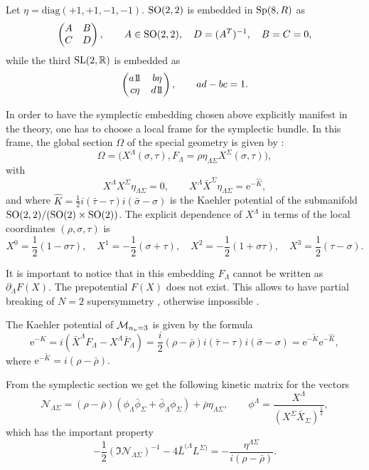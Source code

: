 \documentclass[a4paper,12pt]{article}
\begin{document}
Let $\eta=\mathrm{diag}(+1,+1,-1,-1)$. $\mathrm{SO}(2,2)$ is embedded in
$\mathrm{Sp}(8, R)$ as
$$\begin{pmatrix}
A&B\\C& D\end{pmatrix},\qquad A\in \mathrm{SO}(2,2), \quad D=(A^T)^{-1},
\quad B=C=0,$$ while the  third  $\mathrm{SL}(2,\mathbb{R})$ is embedded as
$$\begin{pmatrix}
a\relax{\rm 1\kern-.28em 1}&b\eta\\c\eta& d\relax{\rm 1\kern-.28em 1}\end{pmatrix},\qquad ad-bc=1.$$

In order to have the symplectic embedding chosen above explicitly
manifest in the theory, one has to choose a local frame for the
symplectic bundle. In this frame, the global section $\Omega$ of
the special geometry is given by \cite{cdfp}:
$$\Omega=\bigl(X^\Lambda(\sigma,\tau),
F_\Lambda=\rho\eta_{\Lambda\Sigma}X^\Sigma(\sigma,\tau)\bigr),$$
with $$X^\Lambda X^\Sigma\eta_{\Lambda\Sigma}=0, \qquad X^\Lambda
\bar X^\Sigma\eta_{\Lambda\Sigma}=\mathrm{e}^{-\hat K},$$ and
where $\hat K= \frac 1 2 i(\bar \tau-\tau)i(\bar \sigma-\sigma)$
is the Kaehler potential of the submanifold
$\mathrm{SO}(2,2)/(\mathrm{SO}(2)\times \mathrm{SO}(2))$. The explicit dependence of
$X^\Lambda$ in terms of the local coordinates $(\rho,\sigma,\tau)$
is
\begin{equation}X^0=\frac 1 2 (1-\sigma\tau), \quad X^1=-\frac 1 2
(\sigma+\tau),\quad X^2=-\frac 1 2 (1+\sigma\tau), \quad X^3=\frac
1 2 (\tau-\sigma).\label{ixlambda}\end{equation}

It is important to notice that in this embedding $F_\Lambda$
cannot be written as $\partial_\Lambda F(X)$. The prepotential
$F(X)$ does not exist. This allows to have partial breaking of
$N=2$ supersymmetry \cite{fgp}, otherwise impossible \cite{cgp}.

The Kaehler potential of $\mathcal{M}_{n_v=3}$ is given by the formula
\begin{equation}\mathrm{e}^{-K}=i(\bar X^\Lambda F_\Lambda-X^\Lambda\bar
F_\Lambda)=\frac i 2 (\rho-\bar\rho)i(\bar\tau
-\tau)i(\bar\sigma-\sigma)=\mathrm{e}^{-\tilde K}
\mathrm{e}^{-\hat K},\label{kaehlerpot}\end{equation} where
$\mathrm{e}^{-\tilde K}= i(\rho-\bar\rho).$


From the symplectic section we get the following kinetic matrix
for the vectors \cite{cdfp,adcdffm}
$$\mathcal{N}_{\Lambda\Sigma}=(\rho-\bar \rho)(\phi_\Lambda\bar
\phi_\Sigma+\bar\phi_\Lambda \phi_\Sigma) +\bar
\rho\eta_{\Lambda\Sigma}, \qquad \phi^\Lambda=\frac
{X^\Lambda}{(X^\Sigma\bar X_\Sigma)^{\frac 1 2}},$$ which has the
important property
$$-\frac 1 2 (\Im\mathcal{N}_{\Lambda\Sigma})^{-1}-4\bar
L^{(\Lambda}L^{\Sigma)}=-\frac {\eta^{\Lambda\Sigma}}{i(\rho-\bar
\rho)}.$$
\end{document}
